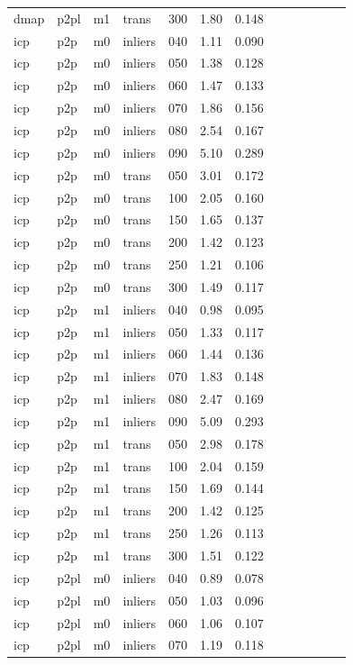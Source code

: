 \begin{table}[htbp]
\begin{tabular}{lllllrrrrrrrr}
  dmap & p2pl & m1 & trans & 300 & 1.80 & 0.148 \\
  icp & p2p & m0 & inliers & 040 & 1.11 & 0.090 \\
  icp & p2p & m0 & inliers & 050 & 1.38 & 0.128 \\
  icp & p2p & m0 & inliers & 060 & 1.47 & 0.133 \\
  icp & p2p & m0 & inliers & 070 & 1.86 & 0.156 \\
  icp & p2p & m0 & inliers & 080 & 2.54 & 0.167 \\
  icp & p2p & m0 & inliers & 090 & 5.10 & 0.289 \\
  icp & p2p & m0 & trans & 050 & 3.01 & 0.172 \\
  icp & p2p & m0 & trans & 100 & 2.05 & 0.160 \\
  icp & p2p & m0 & trans & 150 & 1.65 & 0.137 \\
  icp & p2p & m0 & trans & 200 & 1.42 & 0.123 \\
  icp & p2p & m0 & trans & 250 & 1.21 & 0.106 \\
  icp & p2p & m0 & trans & 300 & 1.49 & 0.117 \\
  icp & p2p & m1 & inliers & 040 & 0.98 & 0.095 \\
  icp & p2p & m1 & inliers & 050 & 1.33 & 0.117 \\
  icp & p2p & m1 & inliers & 060 & 1.44 & 0.136 \\
  icp & p2p & m1 & inliers & 070 & 1.83 & 0.148 \\
  icp & p2p & m1 & inliers & 080 & 2.47 & 0.169 \\
  icp & p2p & m1 & inliers & 090 & 5.09 & 0.293 \\
  icp & p2p & m1 & trans & 050 & 2.98 & 0.178 \\
  icp & p2p & m1 & trans & 100 & 2.04 & 0.159 \\
  icp & p2p & m1 & trans & 150 & 1.69 & 0.144 \\
  icp & p2p & m1 & trans & 200 & 1.42 & 0.125 \\
  icp & p2p & m1 & trans & 250 & 1.26 & 0.113 \\
  icp & p2p & m1 & trans & 300 & 1.51 & 0.122 \\
  icp & p2pl & m0 & inliers & 040 & 0.89 & 0.078 \\
  icp & p2pl & m0 & inliers & 050 & 1.03 & 0.096 \\
  icp & p2pl & m0 & inliers & 060 & 1.06 & 0.107 \\
  icp & p2pl & m0 & inliers & 070 & 1.19 & 0.118 \\

\end{tabular}
\end{table}
